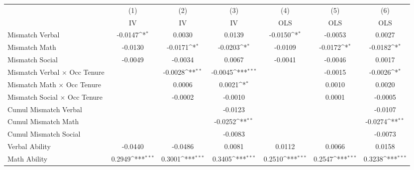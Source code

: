 {
\def\sym#1{\ifmmode^{#1}\else\(^{#1}\)\fi}
\begin{tabular}{l*{6}{c}}
\hline  
                    &\multicolumn{1}{c}{(1)}&\multicolumn{1}{c}{(2)}&\multicolumn{1}{c}{(3)}&\multicolumn{1}{c}{(4)}&\multicolumn{1}{c}{(5)}&\multicolumn{1}{c}{(6)}\\
                    &\multicolumn{1}{c}{IV}&\multicolumn{1}{c}{IV}&\multicolumn{1}{c}{IV}&\multicolumn{1}{c}{OLS}&\multicolumn{1}{c}{OLS}&\multicolumn{1}{c}{OLS}\\
\hline  
Mismatch Verbal     &     -0.0147\sym{*}  &      0.0030         &      0.0139         &     -0.0150\sym{*}  &     -0.0053         &      0.0027         \\
[1em]
Mismatch Math       &     -0.0130         &     -0.0171\sym{*}  &     -0.0203\sym{*}  &     -0.0109         &     -0.0172\sym{*}  &     -0.0182\sym{*}  \\
[1em]
Mismatch Social     &     -0.0049         &     -0.0034         &      0.0067         &     -0.0041         &     -0.0046         &      0.0017         \\
[1em]
Mismatch Verbal $\times$ Occ Tenure&                     &     -0.0028\sym{**} &     -0.0045\sym{***}&                     &     -0.0015         &     -0.0026\sym{*}  \\
[1em]
Mismatch Math $\times$ Occ Tenure&                     &      0.0006         &      0.0021\sym{*}  &                     &      0.0010         &      0.0020         \\
[1em]
Mismatch Social $\times$ Occ Tenure&                     &     -0.0002         &     -0.0010         &                     &      0.0001         &     -0.0005         \\
[1em]
Cumul Mismatch Verbal&                     &                     &     -0.0123         &                     &                     &     -0.0107         \\
[1em]
Cumul Mismatch Math &                     &                     &     -0.0252\sym{**} &                     &                     &     -0.0274\sym{**} \\
[1em]
Cumul Mismatch Social&                     &                     &     -0.0083         &                     &                     &     -0.0073         \\
[1em]
Verbal Ability      &     -0.0440         &     -0.0486         &      0.0081         &      0.0112         &      0.0066         &      0.0158         \\
[1em]
Math Ability        &      0.2949\sym{***}&      0.3001\sym{***}&      0.3405\sym{***}&      0.2510\sym{***}&      0.2547\sym{***}&      0.3238\sym{***}\\

\end{tabular}}
